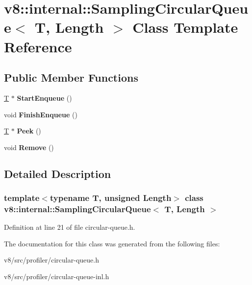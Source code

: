 \hypertarget{classv8_1_1internal_1_1SamplingCircularQueue}{}\section{v8\+:\+:internal\+:\+:Sampling\+Circular\+Queue$<$ T, Length $>$ Class Template Reference}
\label{classv8_1_1internal_1_1SamplingCircularQueue}
\subsection*{Public Member Functions}
\begin{DoxyCompactItemize}
\item 
\mbox{\label{classv8_1_1internal_1_1SamplingCircularQueue_a464bbb1c0a62161897d417f2b6117dbf}} 
\mbox{\hyperlink{classv8_1_1internal_1_1torque_1_1T}{T}} $\ast$ {\bfseries Start\+Enqueue} ()
\item 
\mbox{\label{classv8_1_1internal_1_1SamplingCircularQueue_a80ba4d959f9f8d1fe8af4ce9c4dfa066}} 
void {\bfseries Finish\+Enqueue} ()
\item 
\mbox{\label{classv8_1_1internal_1_1SamplingCircularQueue_a5259fbc4b5d578eecb0ef3a2566890f2}} 
\mbox{\hyperlink{classv8_1_1internal_1_1torque_1_1T}{T}} $\ast$ {\bfseries Peek} ()
\item 
\mbox{\label{classv8_1_1internal_1_1SamplingCircularQueue_ad12288f6816d0390fd9ec26bca49852a}} 
void {\bfseries Remove} ()
\end{DoxyCompactItemize}


\subsection{Detailed Description}
\subsubsection*{template$<$typename T, unsigned Length$>$\newline
class v8\+::internal\+::\+Sampling\+Circular\+Queue$<$ T, Length $>$}



Definition at line 21 of file circular-\/queue.\+h.



The documentation for this class was generated from the following files\+:\begin{DoxyCompactItemize}
\item 
v8/src/profiler/circular-\/queue.\+h\item 
v8/src/profiler/circular-\/queue-\/inl.\+h\end{DoxyCompactItemize}
